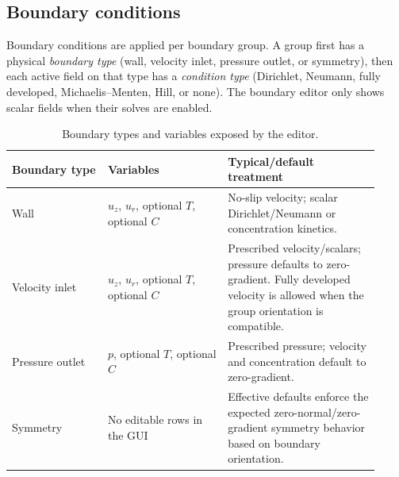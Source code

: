 \documentclass[11pt]{article}
\begin{document}
\subsection{Boundary conditions}\label{sec:bc}
Boundary conditions are applied per boundary group. A group first has a physical
\emph{boundary type} (wall, velocity inlet, pressure outlet, or symmetry), then each
active field on that type has a \emph{condition type} (Dirichlet, Neumann, fully
developed, Michaelis--Menten, Hill, or none). The boundary editor only shows scalar
fields when their solves are enabled.

\begin{table}[h]
\centering
\caption{Boundary types and variables exposed by the editor.}
\label{tab:bc}
\begin{tabular}{@{}>{\raggedright\arraybackslash}p{0.24\linewidth}
                   >{\raggedright\arraybackslash}p{0.30\linewidth}
                   >{\raggedright\arraybackslash}p{0.38\linewidth}@{}}
\toprule
\textbf{Boundary type} & \textbf{Variables} & \textbf{Typical/default treatment} \\
\midrule
Wall & \(u_z\), \(u_r\), optional \(T\), optional \(C\)
     & No-slip velocity; scalar Dirichlet/Neumann or concentration kinetics. \\
Velocity inlet & \(u_z\), \(u_r\), optional \(T\), optional \(C\)
     & Prescribed velocity/scalars; pressure defaults to zero-gradient. Fully developed velocity is allowed when the group orientation is compatible. \\
Pressure outlet & \(p\), optional \(T\), optional \(C\)
     & Prescribed pressure; velocity and concentration default to zero-gradient. \\
Symmetry & No editable rows in the GUI
     & Effective defaults enforce the expected zero-normal/zero-gradient symmetry behavior based on boundary orientation. \\
\bottomrule
\end{tabular}
\end{table}
\end{document}
